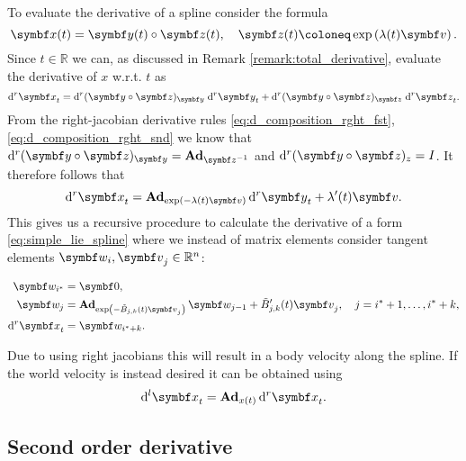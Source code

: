 To evaluate the derivative of a spline consider the formula
\begin{equation}
  \x(t) = \y(t) \circ \z(t), \quad \z(t) \coloneq \exp \left( \lambda(t) \bv \right).
\end{equation}
Since $t \in \mathbb{R}$ we can, as discussed in Remark \ref{remark:total_derivative}, evaluate the derivative of $x$ w.r.t. $t$ as
\begin{equation}
  \mathrm{d}^r \x_t = \mathrm{d}^r (\y \circ \z)_\y \; \mathrm{d}^r \y_t + \mathrm{d}^r (\y \circ \z)_\z \; \mathrm{d}^r \z_t.
\end{equation}
From the right-jacobian derivative rules \eqref{eq:d_composition_rght_fst}, \eqref{eq:d_composition_rght_snd} we know that $\mathrm{d}^r (\y \circ \z)_\y = \bAd_{\z^{-1}}$ and $\mathrm{d}^r (\y \circ \z)_z = I$. It therefore follows that
\begin{equation}
  \mathrm{d}^r \x_t = \bAd_{\exp(-\lambda(t) \bv)} \mathrm{d}^r \y_t + \lambda'(t) \bv.
\end{equation}
This gives us a recursive procedure to calculate the derivative of a form \eqref{eq:simple_lie_spline} where we instead of matrix elements consider tangent elements $\symbf w_i, \bv_j \in \mathbb{R}^n$:
\begin{important}
  \begin{equation}
    \label{eq:bspline_dx_dt}
    \begin{aligned}
      \symbf w_{i^*}    & = \symbf 0,                                                                                                                         \\
      \symbf w_{j}      & = \bAd_{\exp \left( - \tilde B_{j, k}(t) \bv_j \right)} \symbf w_{j-1} + \tilde B_{j, k}'(t) \bv_j, \quad j = i^*+1, \ldots, i^*+k, \\
      \mathrm{d}^r \x_t & = \symbf w_{i^* + k}.
    \end{aligned}
  \end{equation}
\end{important}
Due to using right jacobians this will result in a body velocity along the spline. If the world velocity is instead desired it can be obtained using
\begin{equation}
  \mathrm{d}^l \x_t = \bAd_{x(t)} \mathrm{d}^r \x_t.
\end{equation}

\subsection{Second order derivative}


